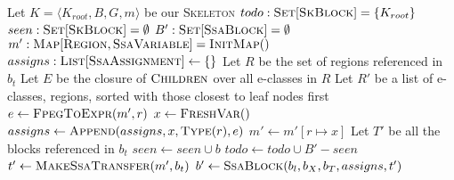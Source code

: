 \documentclass{article}
\newcommand{\tsc}{\textsc}
\begin{document}
\begin{algorithm}
  \begin{algorithmic}[1]
    \STATE Let $K = \langle K_{root}, B, G, m \rangle$ be our \tsc{Skeleton}
    \STATE $todo : \tsc{Set}[\tsc{SkBlock}] = \{ K_{root} \}$
    \STATE $seen : \tsc{Set}[\tsc{SkBlock}] = \emptyset$
    \STATE $B' : \tsc{Set}[\tsc{SsaBlock}] = \emptyset$
    \STATE $m' : \tsc{Map}[\tsc{Region}, \tsc{SsaVariable}] = \tsc{InitMap}()$
      \STATE $assigns : \tsc{List}[\tsc{SsaAssignment}] \gets \{\}$
      \STATE Let $R$ be the set of regions referenced in $b_t$
      \STATE Let $E$ be the closure of $\tsc{Children}$ over all e-classes in $R$
      \STATE Let $R'$ be a list of e-classes, regions, sorted with those closest to leaf nodes first
        \STATE $e \gets \tsc{FpegToExpr}(m', r)$
        \STATE $x \gets \tsc{FreshVar}()$
        \STATE $assigns \gets \tsc{Append}(assigns, x, \tsc{Type}(r), e)$
        \STATE $m' \gets m'[r \mapsto x]$
      \ENDFOR
      \STATE Let $T'$ be all the blocks referenced in $b_t$
      \STATE $seen \gets seen \cup b$
      \STATE $todo \gets todo \cup B' - seen$
      \STATE $t' \gets \tsc{MakeSsaTransfer}(m', b_t)$
      \STATE $b' \gets \tsc{SsaBlock}(b_l, b_X, b_T, assigns, t')$
    \ENDFOR
  \end{algorithmic}
\end{algorithm}




\end{document}
